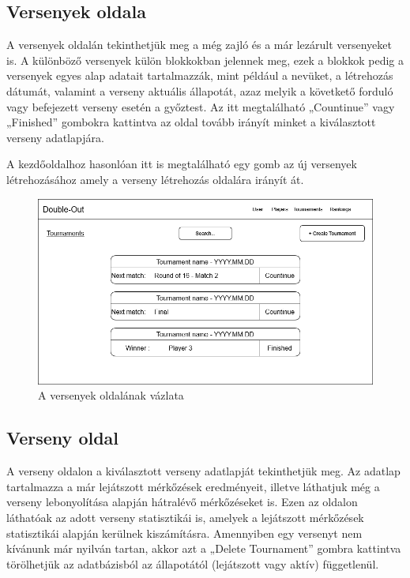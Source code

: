 \subsection{Versenyek oldala}
A versenyek oldalán tekinthetjük meg a még zajló és a már lezárult versenyeket is. A különböző versenyek külön blokkokban jelennek meg, ezek a blokkok pedig a versenyek egyes alap adatait tartalmazzák, mint például a nevüket, a létrehozás dátumát, valamint a verseny aktuális állapotát, azaz melyik a követkető forduló vagy befejezett verseny esetén a győztest. Az itt megtalálható „Countinue” vagy „Finished” gombokra kattintva az oldal tovább irányít minket a kiválasztott verseny adatlapjára.

A kezdőoldalhoz hasonlóan itt is megtalálható egy gomb az új versenyek létrehozásához amely a verseny létrehozás oldalára irányít át. 

\begin{figure}[h]
\centering
\includegraphics[scale=0.3]{images/TournamentsPage.png}
\caption{A versenyek oldalának vázlata}
\label{fig:cimer}
\end{figure}

\subsection{Verseny oldal}
A verseny oldalon a kiválasztott verseny adatlapját tekinthetjük meg. Az adatlap tartalmazza a már lejátszott mérkőzések eredményeit, illetve láthatjuk még a verseny lebonyolítása alapján hátralévő mérkőzéseket is. Ezen az oldalon láthatóak az adott verseny statisztikái is, amelyek a lejátszott mérkőzések statisztikái alapján kerülnek kiszámításra. Amennyiben egy versenyt nem kívánunk már nyilván tartan, akkor azt a „Delete Tournament” gombra kattintva törölhetjük az adatbázisból az állapotától (lejátszott vagy aktív) függetlenül.

